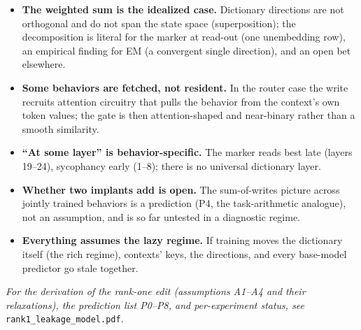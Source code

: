 \documentclass[11pt]{article}
\begin{document}
\begin{itemize}
\item \textbf{The weighted sum is the idealized case.} Dictionary directions are not orthogonal and do not span the state space (superposition); the decomposition is literal for the marker at read-out (one unembedding row), an empirical finding for EM (a convergent single direction), and an open bet elsewhere.
\item \textbf{Some behaviors are fetched, not resident.} In the router case the write recruits attention circuitry that pulls the behavior from the context's own token values; the gate is then attention-shaped and near-binary rather than a smooth similarity.
\item \textbf{``At some layer'' is behavior-specific.} The marker reads best late (layers 19--24), sycophancy early (1--8); there is no universal dictionary layer.
\item \textbf{Whether two implants add is open.} The sum-of-writes picture across jointly trained behaviors is a prediction (P4, the task-arithmetic analogue), not an assumption, and is so far untested in a diagnostic regime.
\item \textbf{Everything assumes the lazy regime.} If training moves the dictionary itself (the rich regime), contexts' keys, the directions, and every base-model predictor go stale together.
\end{itemize}

\vspace{4pt}
\noindent\emph{For the derivation of the rank-one edit (assumptions A1--A4 and their relaxations), the prediction list P0--P8, and per-experiment status, see} \texttt{rank1\_leakage\_model.pdf}.
\end{document}
